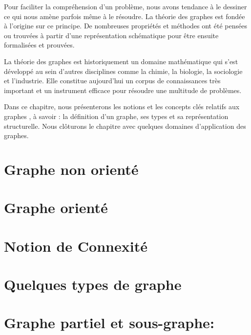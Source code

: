 Pour faciliter la compréhension d'un problème, nous avons tendance à le dessiner ce qui nous amène parfois même à le résoudre. La théorie des graphes est fondée à l'origine sur ce principe. De nombreuses propriétés et méthodes ont été pensées ou trouvées à partir d'une représentation schématique pour être ensuite formalisées et prouvées.


La théorie des graphes est historiquement un domaine mathématique qui s'est développé  au sein d'autres disciplines comme la chimie, la biologie, la sociologie et l'industrie. Elle constitue aujourd'hui un corpus de connaissances très important et un instrument efficace pour résoudre une multitude de problèmes.


Dans ce chapitre, nous présenterons les notions et les concepts clés relatifs aux graphes , à savoir : la définition d'un graphe, ses types et sa représentation structurelle. Nous clôturons le chapitre avec quelques domaines d'application des graphes.

	
	\section{Graphe non orienté}
		
			
	\section{Graphe orienté}	
		
		
	\section{Notion de Connexité}
	
	
	
	\section{Quelques types de graphe}
		
	
	\section{Graphe partiel et sous-graphe:}
    				
	
		
	
	
    		
